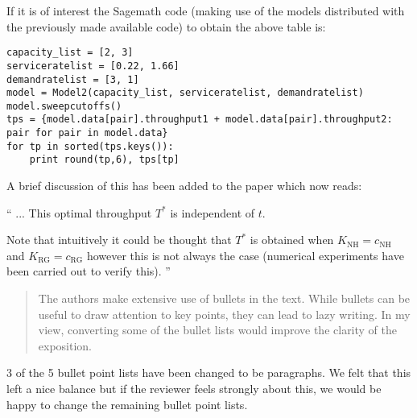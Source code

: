 \documentclass{article}
\newcommand{\NH}{\text{NH}}
\newcommand{\RG}{\text{RG}}
\begin{document}
If it is of interest the Sagemath code (making use of the models distributed
with the previously made available code) to obtain the above table is:

\begin{verbatim}
capacity_list = [2, 3]
serviceratelist = [0.22, 1.66]
demandratelist = [3, 1]
model = Model2(capacity_list, serviceratelist, demandratelist)
model.sweepcutoffs()
tps = {model.data[pair].throughput1 + model.data[pair].throughput2: pair for pair in model.data}
for tp in sorted(tps.keys()):
    print round(tp,6), tps[tp]
\end{verbatim}

A brief discussion of this has been added to the paper which now reads:

``
... This optimal throughput \(T^*\) is
independent of \(t\).

Note that intuitively it could be thought that \(T^*\) is obtained when
\(K_{\NH}=c_{\NH}\) and \(K_{\RG}=c_{\RG}\) however this is not always the case
(numerical experiments have been carried out to verify this).
''


\begin{quote}
    \begin{textit}
        {
The authors make extensive use of bullets in the text. While bullets
can be useful to draw attention to key points, they can lead to lazy
writing. In my view, converting some of the bullet lists would improve
the clarity of the exposition.
        }
    \end{textit}
\end{quote}

3 of the 5 bullet point lists have been changed to be paragraphs. We felt that
this left a nice balance but if the reviewer feels strongly about this, we
would be happy to change the remaining bullet point lists.
\end{document}
